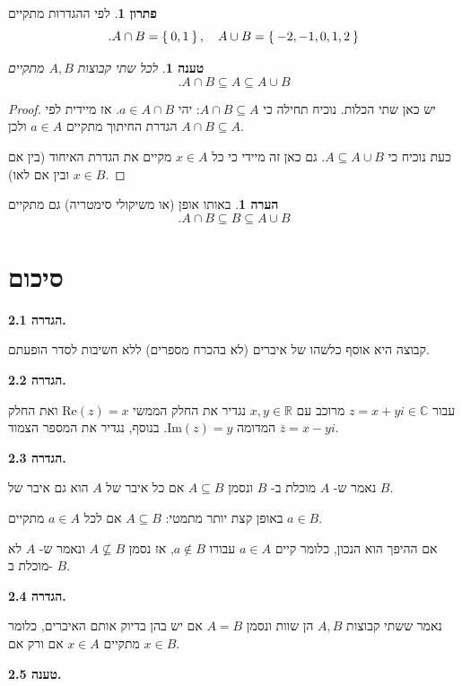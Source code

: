 \documentclass[12pt]{report}
\theoremstyle{plain}
\newtheorem{proposition}[theorem]{טענה}
\theoremstyle{definition}
\newtheorem{remark}{הערה}[chapter]
\newtheorem*{solution}{פתרון}
\newcommand{\R}{\mathbb{R}}
\newcommand{\C}{\mathbb{C}}
\newcommand{\0}{\mathbf{0}}
\begin{document}
\begin{solution}
לפי ההגדרות מתקיים
$$
.A\cap B=\Set{0,1}, \quad A\cup B=\Set{-2,-1,0,1,2}
$$
\end{solution}

\begin{proposition} 
לכל שתי קבוצות $A,B$ מתקיים
$$
.A\cap B\subseteq A\subseteq A\cup B
$$
\end{proposition}

\begin{proof}
יש כאן שתי הכלות. נוכיח תחילה כי $A\cap B\subseteq A$:
יהי $a\in A\cap B$. אז מיידית לפי הגדרת החיתוך מתקיים $a\in A$
ולכן $A\cap B\subseteq A$.

כעת נוכיח כי $A\subseteq A\cup B$. גם כאן זה מיידי כי כל $x\in A$
מקיים את הגדרת האיחוד (בין אם $x\in B$ ובין אם לאו).
\end{proof}

\begin{remark}
באותו אופן (או משיקולי סימטריה) גם מתקיים 
$$
.A\cap B\subseteq B\subseteq A\cup B
$$
\end{remark}

\clearpage
\section{סיכום}
\noindent\textbf{הגדרה 2.1.}

קבוצה היא אוסף כלשהו של איברים (לא בהכרח מספרים) ללא
חשיבות לסדר הופעתם.
\bigskip
\bigskip

\noindent\textbf{הגדרה 2.2.}

עבור
$z=x+yi\in\C$
מרוכב עם
$x,y\in\R$
נגדיר את החלק הממשי
$\text{{Re}}(z)=x$
ואת החלק המדומה
$\text{{Im}}(z)=y$.
בנוסף, נגדיר את המספר הצמוד
$\overline{z}=x-yi$.
\bigskip
\bigskip

\noindent\textbf{הגדרה 2.3.}

נאמר ש-
$A$
מוכלת ב-
$B$
ונסמן
$A\subseteq B$
אם כל איבר של
$A$
הוא גם איבר של
$B$.

באופן קצת יותר מתמטי:
$A\subseteq B$
אם לכל
$a\in A$
מתקיים
$a\in B$. 

אם ההיפך הוא הנכון, כלומר קיים
$a\in A$
עבורו
$a\notin B$,
אז נסמן
$A\nsubseteq B$
ונאמר ש-
$A$
לא מוכלת ב-
$B$.
\bigskip
\bigskip

\noindent\textbf{הגדרה 2.4.}

נאמר ששתי קבוצות
$A,B$
הן שוות ונסמן
$A=B$
אם יש בהן בדיוק אותם האיברים, כלומר מתקיים
$x\in A$
אם ורק אם
$x\in B$.
\bigskip
\bigskip

\noindent\textbf{טענה 2.5.}
\end{document}
